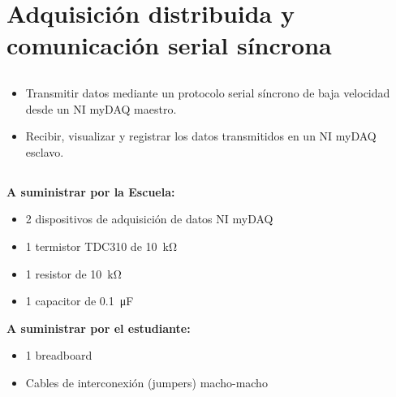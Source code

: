 \chapter{Adquisición distribuida y comunicación serial síncrona}
\section{\obj}
\capacidad
\begin{itemize}
\item Transmitir datos mediante un protocolo serial síncrono de baja velocidad desde un NI myDAQ maestro.
\item Recibir, visualizar y registrar los datos transmitidos en un NI myDAQ esclavo.
\end{itemize}

\section{\mat}
\textbf{A suministrar por la Escuela:}
\begin{itemize}
\item 2 dispositivos de adquisición de datos NI myDAQ
\item 1 termistor TDC310 de \SI{10}{\kilo\ohm}
\item 1 resistor de \SI{10}{\kilo\ohm}
\item 1 capacitor de \SI{0.1}{\micro\farad}
\end{itemize}

\textbf{A suministrar por el estudiante:}
\begin{itemize}
\item 1 breadboard
\item Cables de interconexión (jumpers) macho-macho
\end{itemize}

